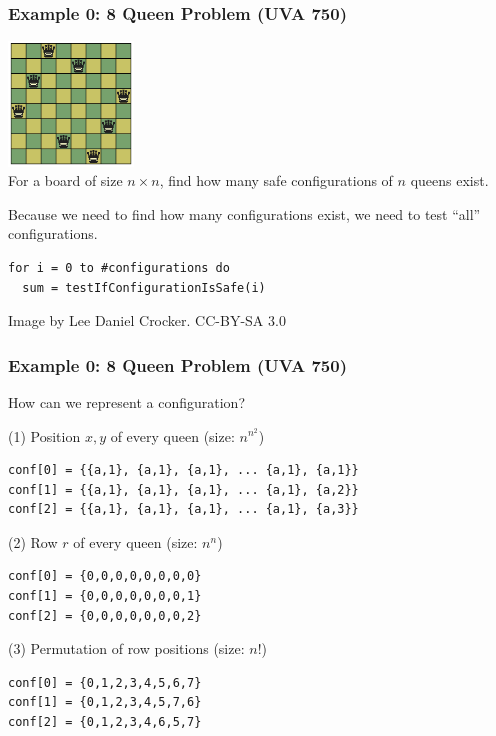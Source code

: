 \documentclass{beamer}
\begin{document}
\begin{frame}[fragile]
  \frametitle{Example 0: 8 Queen Problem (UVA 750)}
  \includegraphics[width=0.25\textwidth]{../img/8queen}\\

  For a board of size $n \times n$, find \alert{how many} safe
  configurations of $n$ queens exist.

  \bigskip

  Because we need to find \alert{how many} configurations exist,
  we need to test ``all'' configurations.

  \bigskip

\begin{verbatim}
for i = 0 to #configurations do
  sum = testIfConfigurationIsSafe(i)
\end{verbatim}

  {\tiny\hfill Image by Lee Daniel Crocker. CC-BY-SA 3.0}
\end{frame}

\begin{frame}[fragile]
  \frametitle{Example 0: 8 Queen Problem (UVA 750)}

How can we represent a configuration?

\bigskip

(1) Position $x,y$ of every queen (size: $n^{n^2}$)
\begin{verbatim}
conf[0] = {{a,1}, {a,1}, {a,1}, ... {a,1}, {a,1}}
conf[1] = {{a,1}, {a,1}, {a,1}, ... {a,1}, {a,2}}
conf[2] = {{a,1}, {a,1}, {a,1}, ... {a,1}, {a,3}}
\end{verbatim}
\bigskip

(2) Row $r$ of every queen (size: $n^n$)
\begin{verbatim}
conf[0] = {0,0,0,0,0,0,0,0}
conf[1] = {0,0,0,0,0,0,0,1}
conf[2] = {0,0,0,0,0,0,0,2}
\end{verbatim}

(3) Permutation of row positions (size: $n!$)
\begin{verbatim}
conf[0] = {0,1,2,3,4,5,6,7}
conf[1] = {0,1,2,3,4,5,7,6}
conf[2] = {0,1,2,3,4,6,5,7}
\end{verbatim}
\end{frame}
\end{document}
